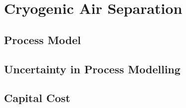 \chapter{Cryogenic Air Separation}
\label{chp:cryo}

\section{Process Model}
\label{sec:model}

\section{Uncertainty in Process Modelling}
\label{sec:uncertainty}

\section{Capital Cost}
\label{sec:capex}

